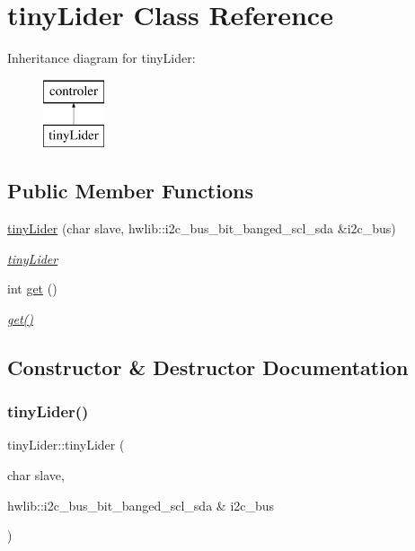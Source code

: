 \hypertarget{classtiny_lider}{}\section{tiny\+Lider Class Reference}
\label{classtiny_lider}
Inheritance diagram for tiny\+Lider\+:\begin{figure}[H]
\begin{center}
\leavevmode
\includegraphics[height=2.000000cm]{classtiny_lider}
\end{center}
\end{figure}
\subsection*{Public Member Functions}
\begin{DoxyCompactItemize}
\item 
\mbox{\hyperlink{classtiny_lider_a68b7cd779d6cec28f53a3c4f4c858c11}{tiny\+Lider}} (char slave, hwlib\+::i2c\+\_\+bus\+\_\+bit\+\_\+banged\+\_\+scl\+\_\+sda \&i2c\+\_\+bus)
\begin{DoxyCompactList}\small\item\em \mbox{\hyperlink{classtiny_lider}{tiny\+Lider}} \end{DoxyCompactList}\item 
int \mbox{\hyperlink{classtiny_lider_ac69b92b0bd4056f6378e7e13aafa57b5}{get}} ()
\begin{DoxyCompactList}\small\item\em \mbox{\hyperlink{classtiny_lider_ac69b92b0bd4056f6378e7e13aafa57b5}{get()}} \end{DoxyCompactList}\end{DoxyCompactItemize}


\subsection{Constructor \& Destructor Documentation}
\mbox{\label{classtiny_lider_a68b7cd779d6cec28f53a3c4f4c858c11}} 
\subsubsection{\texorpdfstring{tiny\+Lider()}{tinyLider()}}
{\footnotesize\ttfamily tiny\+Lider\+::tiny\+Lider (\begin{DoxyParamCaption}\item[{char}]{slave,  }\item[{hwlib\+::i2c\+\_\+bus\+\_\+bit\+\_\+banged\+\_\+scl\+\_\+sda \&}]{i2c\+\_\+bus }\end{DoxyParamCaption})}



